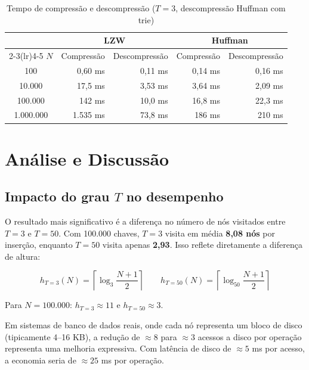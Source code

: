 \documentclass{ifpr-pinhais}
\begin{document}
\begin{table}[H]
\centering
\caption{Tempo de compressão e descompressão ($T = 3$, descompressão Huffman com trie)}
\label{tab:compress_time}
\begin{tabular}{c rr rr}
\toprule
 & \multicolumn{2}{c}{LZW} & \multicolumn{2}{c}{Huffman} \\
\cmidrule(lr){2-3}\cmidrule(lr){4-5}
$N$ & Compressão & Descompressão & Compressão & Descompressão \\
\midrule
100        &  0,60 ms &   0,11 ms &  0,14 ms &   0,16 ms \\
10.000     & 17,5 ms  &   3,53 ms &  3,64 ms &   2,09 ms \\
100.000    & 142 ms   &  10,0 ms  & 16,8 ms  &  22,3 ms  \\
1.000.000  & 1.535 ms &  73,8 ms  & 186 ms   & 210 ms    \\
\bottomrule
\end{tabular}
\end{table}

\section{Análise e Discussão}

\subsection{Impacto do grau $T$ no desempenho}

O resultado mais significativo é a diferença no número de nós visitados entre $T = 3$ e $T = 50$. Com 100.000 chaves, $T = 3$ visita em média \textbf{8,08 nós} por inserção, enquanto $T = 50$ visita apenas \textbf{2,93}. Isso reflete diretamente a diferença de altura:

\[
h_{T=3}(N) = \left\lceil \log_3 \frac{N+1}{2} \right\rceil
\qquad
h_{T=50}(N) = \left\lceil \log_{50} \frac{N+1}{2} \right\rceil
\]

Para $N = 100.000$: $h_{T=3} \approx 11$ e $h_{T=50} \approx 3$.

Em sistemas de banco de dados reais, onde cada nó representa um bloco de disco (tipicamente 4--16 KB), a redução de $\approx 8$ para $\approx 3$ acessos a disco por operação representa uma melhoria expressiva. Com latência de disco de $\approx 5$ ms por acesso, a economia seria de $\approx 25$ ms por operação.
\end{document}
